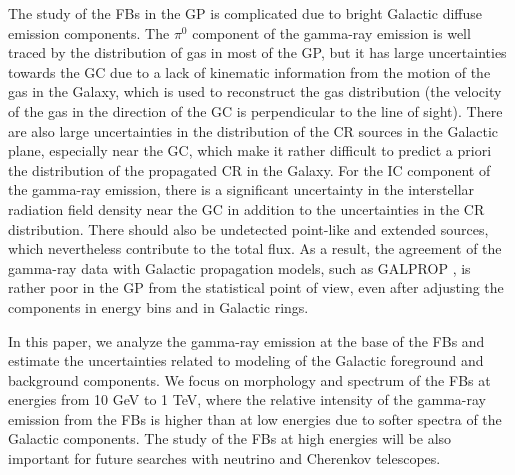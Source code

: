 The study of the FBs in the GP is complicated due to bright Galactic diffuse emission components.
The $\pi^0$ component of the gamma-ray emission is well traced by the distribution of gas in most of the GP,
but it has large uncertainties towards the GC due to a lack of kinematic information from the motion of the gas in the 
Galaxy, which is used to reconstruct the gas distribution
(the velocity of the gas in the direction of the GC is perpendicular to the line of sight).
There are also large uncertainties in the distribution of the CR sources in the Galactic plane, especially near the GC,
which make it rather difficult to predict a priori 
the distribution of the propagated CR in the Galaxy.
For the IC component of the gamma-ray emission, 
there is a significant uncertainty in the interstellar radiation field density near the GC \citep[e.g.,][]{2017ApJ...846...67P} in addition to 
the uncertainties in the CR distribution.
There should also be undetected point-like and extended sources, which nevertheless contribute to the total flux.
As a result, the agreement of the gamma-ray data with Galactic propagation models, such as GALPROP \citep{2007ARNPS..57..285S}, 
is rather poor in the GP from the statistical point of view, even after adjusting the components in energy bins and in Galactic rings.

In this paper, we analyze the gamma-ray emission at the base of the FBs and 
estimate the uncertainties %
related to modeling of the Galactic foreground and background components.
We focus on morphology and spectrum of the FBs at energies from 10 GeV to 1 TeV,
where the relative intensity of the gamma-ray emission from the FBs is higher than at low energies due to softer spectra of the Galactic components.
The study of the FBs at high energies will be also important for future searches with neutrino and Cherenkov telescopes.

